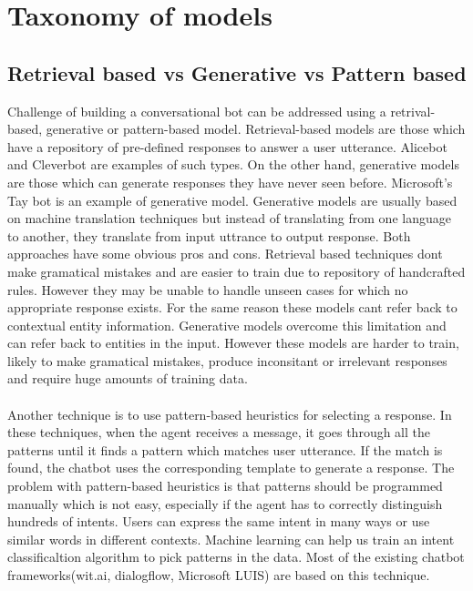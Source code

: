 \documentclass[letterpaper] {article} %
\begin{document}
\section{Taxonomy of models}
\subsection{Retrieval based vs Generative vs Pattern based}
Challenge of building a conversational bot can be addressed using a retrival-based, generative or pattern-based model. Retrieval-based models are those which have a repository of pre-defined responses to answer a user utterance. Alicebot and Cleverbot are examples of such types. On the other hand, generative models are those which can generate responses they have never seen before. Microsoft's Tay bot is an example of generative model. Generative models are usually based on machine translation techniques but instead of translating from one language to another, they translate from input uttrance to output response. Both approaches have some obvious pros and cons. Retrieval based techniques dont make gramatical mistakes and are easier to train due to repository of handcrafted rules. However they may be unable to handle unseen cases for which no appropriate response exists. For the same reason these models cant refer back to contextual entity information. Generative models overcome this limitation and can refer back to entities in the input. However these models are harder to train, likely to make gramatical mistakes, produce inconsitant or irrelevant responses and require huge amounts of training data.  %
\\\\
Another technique is to use pattern-based heuristics for selecting a response. In these techniques, when the agent receives a message, it goes through all the patterns until it finds a pattern which matches user utterance. If the match is found, the chatbot uses the corresponding template to generate a response. The problem with pattern-based heuristics is that patterns should be programmed manually which is not easy, especially if the agent has to correctly distinguish hundreds of intents. Users can express the same intent in many ways or use similar words in different contexts. Machine learning can help us train an intent classificaltion algorithm to pick patterns in the data. Most of the existing chatbot frameworks(wit.ai, dialogflow, Microsoft LUIS) are based on this technique.
\end{document}
